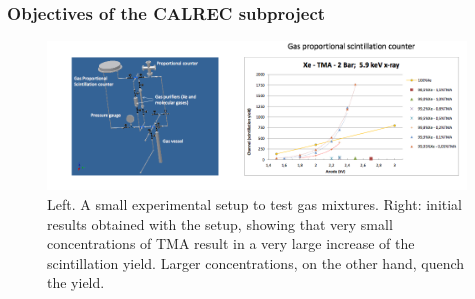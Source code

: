 %
%

\subsubsection*{Objectives of the CALREC subproject}

\begin{figure}
\begin{center}
\includegraphics[width=0.99\textwidth]{img/TMA.png}
\caption{\small Left. A small experimental setup to test gas mixtures. Right: initial results obtained with the setup, showing that very small concentrations of TMA result in a very large increase of the scintillation yield. Larger concentrations, on the other hand, quench the yield. }
\label{fig:additives}
\end{center}
\end{figure}




